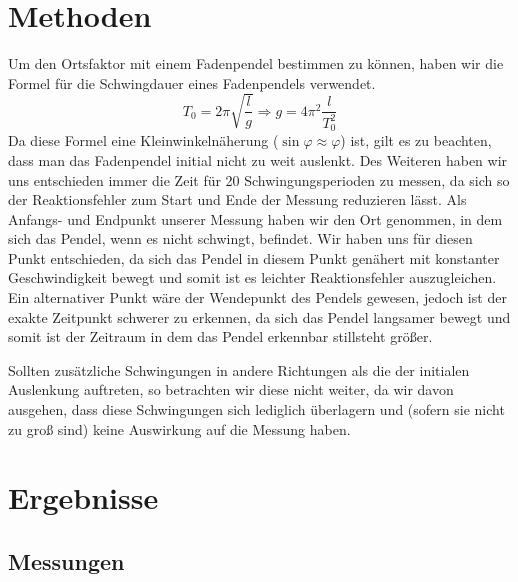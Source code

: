\documentclass[
	a4paper,
	12pt,
	pagesize,
	ngerman
]{scrartcl}
\begin{document}
	\newpage
	\section{Methoden}
	Um den Ortsfaktor mit einem Fadenpendel bestimmen zu können, haben wir die Formel für die Schwingdauer eines Fadenpendels verwendet.
		\begin{equation}\label{eq:Ortsfaktor}
			T_0 = 2\pi \sqrt{\frac{l}{g}}
			\Rightarrow{} g = 4\pi{}^2\frac{l}{T_0^2}
		\end{equation}
	Da diese Formel eine Kleinwinkelnäherung (\(\sin{\varphi} \approx \varphi \)) ist, gilt es zu beachten, dass man das Fadenpendel initial nicht zu weit auslenkt. 
	Des Weiteren haben wir uns entschieden immer die Zeit für 20 Schwingungsperioden zu messen, da sich so der Reaktionsfehler zum Start und Ende der Messung reduzieren lässt.
	Als Anfangs- und Endpunkt unserer Messung haben wir den Ort genommen, in dem sich das Pendel, wenn es nicht schwingt, befindet. Wir haben uns für diesen Punkt entschieden, da sich das Pendel in diesem Punkt genähert mit konstanter Geschwindigkeit bewegt und somit ist es leichter Reaktionsfehler auszugleichen. Ein alternativer Punkt wäre der Wendepunkt des Pendels gewesen, jedoch ist der exakte Zeitpunkt schwerer zu erkennen, da sich das Pendel langsamer bewegt und somit ist der Zeitraum in dem das Pendel erkennbar stillsteht größer.\par
	Sollten zusätzliche Schwingungen in andere Richtungen als die der initialen Auslenkung auftreten, so betrachten wir diese nicht weiter, da wir davon ausgehen, dass diese Schwingungen sich lediglich überlagern und (sofern sie nicht zu groß sind) keine Auswirkung auf die Messung haben.  
	\newpage
	\section{Ergebnisse}
	\subsection{Messungen}
\end{document}
